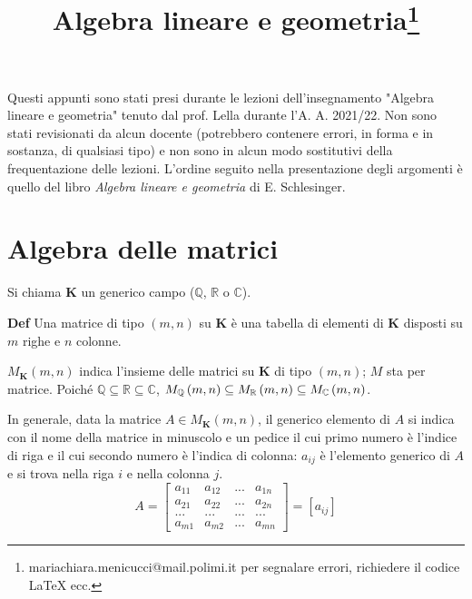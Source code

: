 \documentclass{article}
\title{Algebra lineare e geometria\footnote{mariachiara.menicucci@mail.polimi.it per segnalare errori, richiedere il codice LaTeX ecc.}}
\begin{document}
\maketitle
Questi appunti sono stati presi durante le lezioni dell'insegnamento "Algebra lineare e geometria" tenuto dal prof. Lella durante l'A. A. 2021/22. Non sono stati revisionati da alcun docente (potrebbero contenere errori, in forma e in sostanza, di qualsiasi tipo) e non sono in alcun modo sostitutivi della frequentazione delle lezioni. L'ordine seguito nella presentazione degli argomenti è quello del libro \emph{Algebra lineare e geometria} di E. Schlesinger.
\newpage
\tableofcontents

\newpage

\section{Algebra delle matrici}

Si chiama $\mathbf{K}$ un generico campo ($%
\mathbb{Q}
$, $%
\mathbb{R}
$ o $%
\mathbb{C}
$).

\textbf{Def} Una matrice di tipo $\left( m,n\right) $ su $\mathbf{K}$ \`{e}
una tabella di elementi di $\mathbf{K}$ disposti su $m$ righe e $n$ colonne.

$M_{\mathbf{K}}\left( m,n\right) $ indica l'insieme delle matrici su $%
\mathbf{K}$ di tipo $\left( m,n\right) $; $M$ sta per matrice. Poich\'{e} $%
\mathbb{Q}
\subseteq 
\mathbb{R}
\subseteq 
\mathbb{C}
$, $M_{%
\mathbb{Q}
}\left( m,n\right) \subseteq M_{%
\mathbb{R}
}\left( m,n\right) \subseteq M_{%
\mathbb{C}
}\left( m,n\right) $.

In generale, data la matrice $A\in M_{\mathbf{K}}\left( m,n\right) $, il
generico elemento di $A$ si indica con il nome della matrice in minuscolo e
un pedice il cui primo numero \`{e} l'indice di riga e il cui secondo numero 
\`{e} l'indica di colonna: $a_{ij}$ \`{e} l'elemento generico di $A$ e si
trova nella riga $i$ e nella colonna $j$.%
\begin{equation*}
A=\left[ 
\begin{array}{cccc}
a_{11} & a_{12} & ... & a_{1n} \\ 
a_{21} & a_{22} & ... & a_{2n} \\ 
... & ... & ... & ... \\ 
a_{m1} & a_{m2} & ... & a_{mn}%
\end{array}%
\right] =\left[ a_{ij}\right]
\end{equation*}
\end{document}

